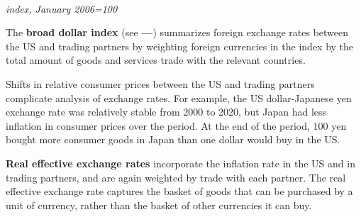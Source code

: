 \begin{minipage}{0.36\textwidth}
\\
\footnotesize{\textit{index, January 2006=100}}\\
\edef\custticks{{2006-01-01}, \afticks}
\end{minipage}\hspace{5mm}
\begin{minipage}{0.36\textwidth}
\small The \textbf{broad dollar index} (see {\color{navyblue}\textbf{---}}) summarizes foreign exchange rates between the US and trading partners by weighting foreign currencies in the index by the total amount of goods and services trade with the relevant countries.




\end{minipage}
\newpage

\begin{minipage}{0.76\textwidth}   
\small Shifts in relative consumer prices between the US and trading partners complicate analysis of exchange rates. For example, the US dollar-Japanese yen exchange rate was relatively stable from 2000 to 2020, but Japan had less inflation in consumer prices over the period. At the end of the period, 100 yen bought more consumer goods in Japan than one dollar would buy in the US. 

\textbf{Real effective exchange rates} incorporate the inflation rate in the US and in trading partners, and are again weighted by trade with each partner. The real effective exchange rate captures the basket of goods that can be purchased by a unit of currency, rather than the basket of other currencies it can buy. 
\end{minipage}
\vspace{1mm}

